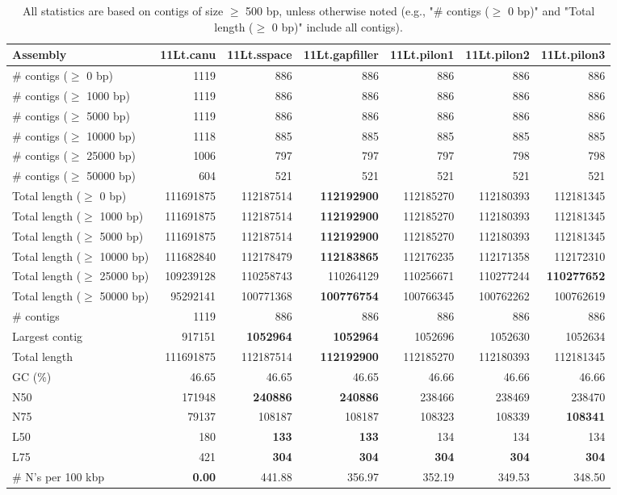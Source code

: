\documentclass[12pt,a4paper]{article}
\begin{document}
\begin{table}[ht]
\begin{center}
\caption{All statistics are based on contigs of size $\geq$ 500 bp, unless otherwise noted (e.g., "\# contigs ($\geq$ 0 bp)" and "Total length ($\geq$ 0 bp)" include all contigs).}
\begin{tabular}{|l*{6}{|r}|}
\hline
Assembly & 11Lt.canu & 11Lt.sspace & 11Lt.gapfiller & 11Lt.pilon1 & 11Lt.pilon2 & 11Lt.pilon3 \\ \hline
\# contigs ($\geq$ 0 bp) & 1119 & 886 & 886 & 886 & 886 & 886 \\ \hline
\# contigs ($\geq$ 1000 bp) & 1119 & 886 & 886 & 886 & 886 & 886 \\ \hline
\# contigs ($\geq$ 5000 bp) & 1119 & 886 & 886 & 886 & 886 & 886 \\ \hline
\# contigs ($\geq$ 10000 bp) & 1118 & 885 & 885 & 885 & 885 & 885 \\ \hline
\# contigs ($\geq$ 25000 bp) & 1006 & 797 & 797 & 797 & 798 & 798 \\ \hline
\# contigs ($\geq$ 50000 bp) & 604 & 521 & 521 & 521 & 521 & 521 \\ \hline
Total length ($\geq$ 0 bp) & 111691875 & 112187514 & {\bf 112192900} & 112185270 & 112180393 & 112181345 \\ \hline
Total length ($\geq$ 1000 bp) & 111691875 & 112187514 & {\bf 112192900} & 112185270 & 112180393 & 112181345 \\ \hline
Total length ($\geq$ 5000 bp) & 111691875 & 112187514 & {\bf 112192900} & 112185270 & 112180393 & 112181345 \\ \hline
Total length ($\geq$ 10000 bp) & 111682840 & 112178479 & {\bf 112183865} & 112176235 & 112171358 & 112172310 \\ \hline
Total length ($\geq$ 25000 bp) & 109239128 & 110258743 & 110264129 & 110256671 & 110277244 & {\bf 110277652} \\ \hline
Total length ($\geq$ 50000 bp) & 95292141 & 100771368 & {\bf 100776754} & 100766345 & 100762262 & 100762619 \\ \hline
\# contigs & 1119 & 886 & 886 & 886 & 886 & 886 \\ \hline
Largest contig & 917151 & {\bf 1052964} & {\bf 1052964} & 1052696 & 1052630 & 1052634 \\ \hline
Total length & 111691875 & 112187514 & {\bf 112192900} & 112185270 & 112180393 & 112181345 \\ \hline
GC (\%) & 46.65 & 46.65 & 46.65 & 46.66 & 46.66 & 46.66 \\ \hline
N50 & 171948 & {\bf 240886} & {\bf 240886} & 238466 & 238469 & 238470 \\ \hline
N75 & 79137 & 108187 & 108187 & 108323 & 108339 & {\bf 108341} \\ \hline
L50 & 180 & {\bf 133} & {\bf 133} & 134 & 134 & 134 \\ \hline
L75 & 421 & {\bf 304} & {\bf 304} & {\bf 304} & {\bf 304} & {\bf 304} \\ \hline
\# N's per 100 kbp & {\bf 0.00} & 441.88 & 356.97 & 352.19 & 349.53 & 348.50 \\ \hline
\end{tabular}
\end{center}
\end{table}
\end{document}
